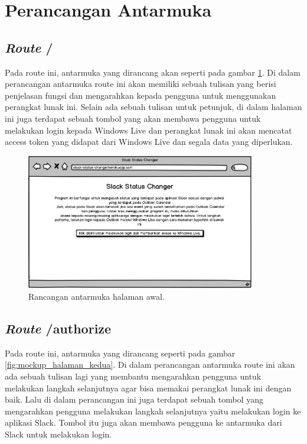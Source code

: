 \section{Perancangan Antarmuka}
\subsection{\textit{Route} /}
Pada route ini, antarmuka yang dirancang akan seperti pada gambar \ref{fig:mockup_halaman_awal}. Di dalam perancangan antarmuka route ini akan memiliki sebuah tulisan yang berisi penjelasan fungsi dan mengarahkan kepada pengguna untuk menggunakan perangkat lunak ini. Selain ada sebuah tulisan untuk petunjuk, di dalam halaman ini juga terdapat sebuah tombol yang akan membawa pengguna untuk melakukan login kepada Windows Live dan perangkat lunak ini akan mencatat access token yang didapat dari Windows Live dan segala data yang diperlukan. 

\begin{figure}[h]
  \includegraphics[width=10cm]{./Gambar/MockUp/Step1.png}
  \centering
  \caption{Rancangan antarmuka halaman awal.}
  \label{fig:mockup_halaman_awal}
\end{figure}

\subsection{\textit{Route} /authorize}
Pada route ini, antarmuka yang dirancang seperti pada gambar \ref{fig:mockup_halaman_kedua}. Di dalam perancangan antarmuka route ini akan ada sebuah tulisan lagi yang membantu mengarahkan pengguna untuk melakukan langkah selanjutnya agar bisa memakai perangkat lunak ini dengan baik. Lalu di dalam perancangan ini juga terdapat sebuah tombol yang mengarahkan pengguna melakukan langkah selanjutnya yaitu melakukan login ke aplikasi Slack. Tombol itu juga akan membawa pengguna ke antarmuka dari Slack untuk melakukan login. 

